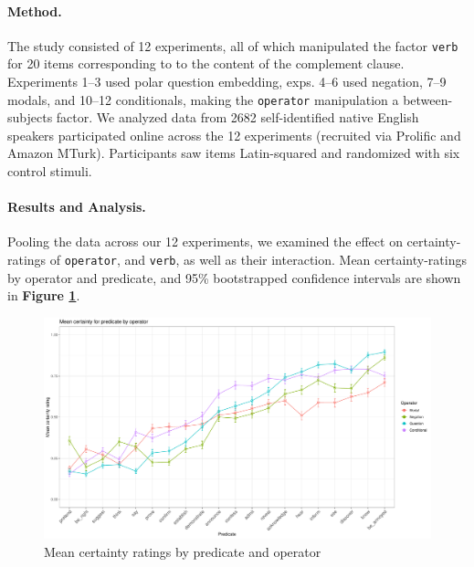 \documentclass[12pt, a4paper]{scrartcl}
\begin{document}

\vspace{-\baselineskip}
\paragraph{Method.} \hspace{-1em}
	The study consisted of 12 experiments, all of which manipulated the factor \texttt{verb} for 20 items corresponding to to the content of the complement clause. Experiments 1--3 used polar question embedding, exps. 4--6 used negation, 7--9 modals, and 10--12 conditionals, making the \texttt{operator} manipulation a between-subjects factor. We analyzed data from 2682 self-identified native English speakers participated online across the 12 experiments (recruited via Prolific and Amazon MTurk). Participants saw items Latin-squared and randomized with six control stimuli.


\paragraph{Results and Analysis.} \hspace{-1em}
	Pooling the data across our 12 experiments, we examined the effect on certainty-ratings of \texttt{operator}, and \texttt{verb}, as well as their interaction. Mean certainty-ratings by operator and predicate, and 95\% bootstrapped confidence intervals are shown in  \textbf{Figure \ref{fig:figure1}}.

	\begin{figure}[h]
		\vspace{-.8\baselineskip}
		\centering
		\includegraphics[width=\textwidth]{graphs/proj-by-both.pdf}\vspace{-1.2\baselineskip}
		\caption{\small Mean certainty ratings by predicate and operator}
		\label{fig:figure1}
	\end{figure}
\end{document}
